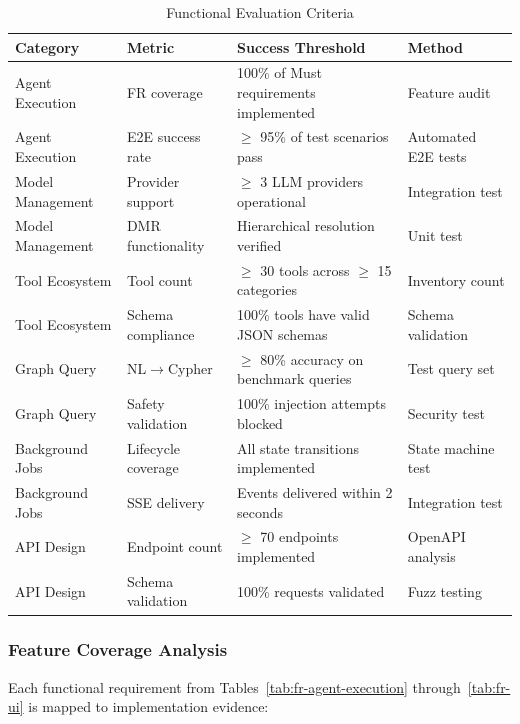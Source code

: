 \documentclass[a4paper,twoside]{sapthesis}
\begin{document}
\begin{table}[htbp]
\centering
\caption{Functional Evaluation Criteria}
\label{tab:functional-eval}
\small
\begin{tabularx}{\textwidth}{|l|l|X|l|}
\hline
\textbf{Category} & \textbf{Metric} & \textbf{Success Threshold} & \textbf{Method} \\
\midrule
Agent Execution & FR coverage & 100\% of Must requirements implemented & Feature audit \\
\midrule
Agent Execution & E2E success rate & $\geq$ 95\% of test scenarios pass & Automated E2E tests \\
\midrule
Model Management & Provider support & $\geq$ 3 LLM providers operational & Integration test \\
\midrule
Model Management & DMR functionality & Hierarchical resolution verified & Unit test \\
\midrule
Tool Ecosystem & Tool count & $\geq$ 30 tools across $\geq$ 15 categories & Inventory count \\
\midrule
Tool Ecosystem & Schema compliance & 100\% tools have valid JSON schemas & Schema validation \\
\midrule
Graph Query & NL$\rightarrow$Cypher & $\geq$ 80\% accuracy on benchmark queries & Test query set \\
\midrule
Graph Query & Safety validation & 100\% injection attempts blocked & Security test \\
\midrule
Background Jobs & Lifecycle coverage & All state transitions implemented & State machine test \\
\midrule
Background Jobs & SSE delivery & Events delivered within 2 seconds & Integration test \\
\midrule
API Design & Endpoint count & $\geq$ 70 endpoints implemented & OpenAPI analysis \\
\midrule
API Design & Schema validation & 100\% requests validated & Fuzz testing \\
\midrule
\end{tabularx}
\end{table}

\subsubsection{Feature Coverage Analysis}

Each functional requirement from Tables~\ref{tab:fr-agent-execution} through~\ref{tab:fr-ui} is mapped to implementation evidence:
\end{document}

